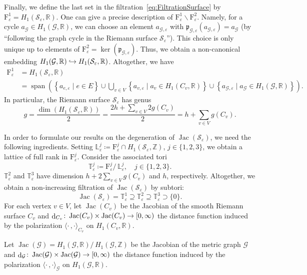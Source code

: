 \documentclass[AHL,Unicode,longabstracts]{cedram}
\newcommand{\innone}[2]{{\langle#2\rangle_{#1}}}
\newcommand{\rquot}[2]{#1/\,#2}
\DeclareMathOperator{\Jac}{Jac}
\DeclareMathOperator{\spann}{span}
\DeclareMathOperator{\dist}{d}
\newcommand{\graphgenus}{{h}}
\newcommand{\filter}{\mathrm{F}}
\newcommand{\R}{\mathbb{R}}
\newcommand{\Z}{\mathbb{Z}}
\newcommand{\T}{\mathbb{T}}
\renewcommand{\L}{\mathbb{L}}
\newcommand{\mgr}{\mathcal{G}}
\newcommand{\rsf}{\mathcal{S}}
\newcommand{\proj}{\mathfrak{p}}
\renewcommand{\setminus}{\smallsetminus}
\renewcommand*{\to}{\mathchoice{\longrightarrow}{\rightarrow}{\rightarrow}{\rightarrow}}
\newcommand{\longhookrightarrow}{\lhook\joinrel\longrightarrow}
\newcommand*{\hookto}{\mathchoice{\longhookrightarrow}{\hookrightarrow}{\hookrightarrow}{\hookrightarrow}}
\begin{document}
Finally, we define the last set in the filtration~\eqref{eq:FiltrationSurface} by $\filter^1_\varepsilon =H_1(\rsf_\varepsilon,\R)$. One can give a precise description of $\filter^1_\varepsilon \setminus\filter^2_\varepsilon$. Namely, for a cycle $a_\mgr \in H_1(\mgr, \R)$, we can choose an element $a_{\mgr, \varepsilon}$ with $\proj_{\mgr, \varepsilon}(a_{\mgr, \varepsilon}) = a_\mgr$ (by ``following the graph cycle in the Riemann surface $\rsf_\varepsilon$''). This choice is only unique up to elements of $\filter^2_\varepsilon = \ker(\proj_{\mgr, \varepsilon})$. Thus, we obtain a non-canonical embedding $H_1(\mgr, \R) \hookto H_1(\rsf_\varepsilon, \R)$. Altogether, we have
\begin{align*}
\filter^1_\varepsilon &= H_1(\rsf_\varepsilon, \R)\\
&=\spann \left(\left\{a_{e, \varepsilon}\mid e \in E \right\} \cup \bigcup_{v \in V} \left\{a_{v, \varepsilon}\mid a_v \in H_1(C_v, \R) \right\} \cup \left\{ a_{\mgr, \varepsilon} \mid a_\mgr \in H_1(\mgr, \R) \right\}\right).
\end{align*}
In particular, the Riemann surface $\rsf_\varepsilon$ has genus
\[
g = \frac{\dim(H_1(\rsf_\varepsilon, \R))}{2} = \frac{2 \graphgenus + \sum_{v \in V} 2 g(C_v)}{2} = \graphgenus + \sum_{v \in V} g(C_v).
\]

In order to formulate our results on the degeneration of $\Jac(\rsf_\varepsilon)$, we need the following ingredients. Setting $\L^j_\varepsilon \coloneqq \filter^j_\varepsilon \cap H_1(\rsf_\varepsilon, \Z)$, $j \in \{1,2,3\}$, we obtain a lattice of full rank in $\filter^j_\varepsilon$. Consider the associated tori
\[
\T^j_\varepsilon \coloneqq \rquot{\filter^j_\varepsilon}{\L^j_\varepsilon}, \quad j \in \{1,2,3\}.
\]
$\T^2_\varepsilon$ and $\T^3_\varepsilon$ have dimension $\graphgenus + 2 \sum_{v \in V} g(C_v)$ and $\graphgenus$, respectively. Altogether, we obtain a non-increasing filtration of $\Jac(\rsf_\varepsilon)$ by subtori:
\[
\Jac(\rsf_\varepsilon) = \T^1_\varepsilon \supseteq \T^2_\varepsilon \supseteq \T^3_\varepsilon \supset \{0\}.
\]
For each vertex $v \in V$, let $\Jac(C_v)$ be the Jacobian of the smooth Riemann surface $C_v$ and $\dist_{C_v} \colon \Jac(C_v) \times \Jac(C_v) \to [0, \infty)$ the distance function induced by the polarization $\innone{C_v}{\cdot \,, \cdot}$ on $H_1(C_v, \R)$.

Let $\Jac(\mgr) = \rquot{H_1(\mgr, \R)}{H_1(\mgr, \Z)}$ be the Jacobian of the metric graph $\mgr$ and $\dist_\mgr \colon \Jac(\mgr) \times \Jac(\mgr) \to [0, \infty)$ the distance function induced by the polarization $\innone{\mgr}{\cdot \,, \cdot}$ on $H_1(\mgr, \R)$.
\end{document}
